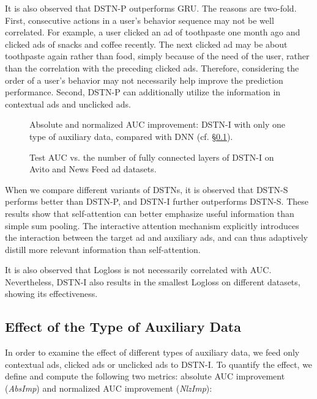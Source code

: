 \documentclass[sigconf]{acmart}
\begin{document}
It is also observed that DSTN-P outperforms GRU. The reasons are two-fold. First, consecutive actions in a user's behavior sequence may not be well correlated. For example, a user clicked an ad of toothpaste one month ago and clicked ads of snacks and coffee recently. The next clicked ad may be about toothpaste again rather than food, simply because of the need of the user, rather than the correlation with the preceding clicked ads. Therefore, considering the order of a user's behavior may not necessarily help improve the prediction performance. Second, DSTN-P can additionally utilize the information in contextual ads and unclicked ads.

\begin{figure}[!t]
\centering
{}
\vskip -8pt
\caption{Absolute and normalized AUC improvement: DSTN-I with only one type of auxiliary data, compared with DNN (cf. \S\ref{sec_aux_type}).}
\vskip -8pt
\label{auc_imp}
\end{figure}

\begin{figure}[!t]
\centering
{}
\vskip -8pt
\caption{Test AUC vs. the number of fully connected layers of DSTN-I on Avito and News Feed ad datasets.}
\vskip -8pt
\label{n_layer}
\end{figure}

When we compare different variants of DSTNs, it is observed that DSTN-S performs better than DSTN-P, and DSTN-I further outperforms DSTN-S. These results show that self-attention can better emphasize useful information than simple sum pooling. The interactive attention mechanism explicitly introduces the interaction between the target ad and auxiliary ads, and can thus adaptively distill more relevant information than self-attention.

It is also observed that Logloss is not necessarily correlated with AUC. Nevertheless, DSTN-I also results in the smallest Logloss on different datasets, showing its effectiveness.

\subsection{Effect of the Type of Auxiliary Data} \label{sec_aux_type}
In order to examine the effect of different types of auxiliary data, we feed only contextual ads, clicked ads or unclicked ads to DSTN-I.
To quantify the effect, we define and compute the following two metrics: absolute AUC improvement (\emph{AbsImp}) and normalized AUC improvement (\emph{NlzImp}):
\end{document}
